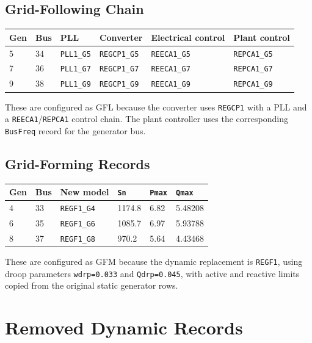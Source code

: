 \documentclass[10pt,letterpaper]{article}
\begin{document}
\subsection{Grid-Following Chain}

\begin{center}
\begin{tabular}{llllll}
\toprule
Gen & Bus & PLL & Converter & Electrical control & Plant control \\
\midrule
5 & 34 & \texttt{PLL1\_G5} & \texttt{REGCP1\_G5} & \texttt{REECA1\_G5} & \texttt{REPCA1\_G5} \\
7 & 36 & \texttt{PLL1\_G7} & \texttt{REGCP1\_G7} & \texttt{REECA1\_G7} & \texttt{REPCA1\_G7} \\
9 & 38 & \texttt{PLL1\_G9} & \texttt{REGCP1\_G9} & \texttt{REECA1\_G9} & \texttt{REPCA1\_G9} \\
\bottomrule
\end{tabular}
\end{center}

These are configured as GFL because the converter uses \texttt{REGCP1} with a
PLL and a \texttt{REECA1}/\texttt{REPCA1} control chain. The plant controller
uses the corresponding \texttt{BusFreq} record for the generator bus.

\subsection{Grid-Forming Records}

\begin{center}
\begin{tabular}{llllll}
\toprule
Gen & Bus & New model & \texttt{Sn} & \texttt{Pmax} & \texttt{Qmax} \\
\midrule
4 & 33 & \texttt{REGF1\_G4} & 1174.8 & 6.82 & 5.48208 \\
6 & 35 & \texttt{REGF1\_G6} & 1085.7 & 6.97 & 5.93788 \\
8 & 37 & \texttt{REGF1\_G8} & 970.2 & 5.64 & 4.43468 \\
\bottomrule
\end{tabular}
\end{center}

These are configured as GFM because the dynamic replacement is \texttt{REGF1},
using droop parameters \texttt{wdrp=0.033} and \texttt{Qdrp=0.045}, with active
and reactive limits copied from the original static generator rows.

\section{Removed Dynamic Records}
\end{document}
